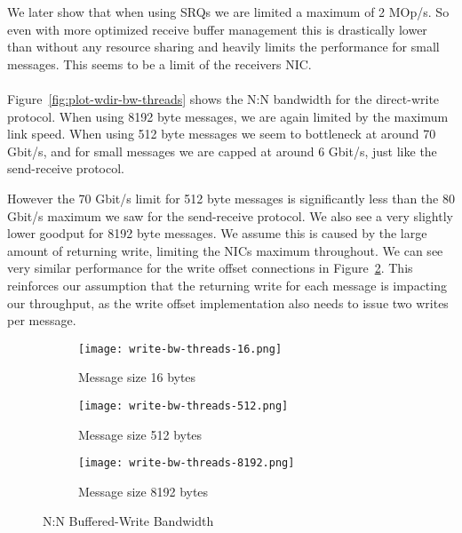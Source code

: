 We later show that when using SRQs we are limited a maximum of 2 MOp/s. So even with more optimized receive buffer management
this is drastically lower than without any resource  sharing and heavily limits the performance for small messages. This seems
to be a limit of the receivers NIC.

\paragraph{} Figure~\ref{fig:plot-wdir-bw-threads} shows the N:N bandwidth for the direct-write protocol. When using 8192 
byte messages, we are again limited by the maximum link speed. When using 512 byte messages we seem to bottleneck at around 
70 Gbit/s, and for small messages we are capped at around 6 Gbit/s, just like the send-receive protocol.

However the 70 Gbit/s limit for 512 byte messages is significantly less than the 80 Gbit/s maximum we saw for the
send-receive protocol. We also see a very slightly lower goodput for 8192 byte messages. We assume this is caused by the 
large amount of returning write, limiting the NICs maximum throughout. We can see very similar performance for the
write offset connections in Figure~\ref{fig:plot-write-bw-thread-512}. This reinforces our assumption that the returning write
for each message is impacting our throughput, as the write offset implementation also needs to issue two writes per message.




\begin{figure}[ht]
  \centering
\begin{subfigure}[b]{0.49\textwidth}
  \centering
  \texttt{[image: write-bw-threads-16.png]}
  \caption{Message size 16 bytes}
  \label{fig:plot-write-bw-thread-16}
\end{subfigure}
\begin{subfigure}[b]{0.49\textwidth}
  \centering
  \texttt{[image: write-bw-threads-512.png]}
  \caption{Message size 512 bytes}
  \label{fig:plot-write-bw-thread-512}
\end{subfigure}
\begin{subfigure}[b]{0.49\textwidth}
  \centering
  \texttt{[image: write-bw-threads-8192.png]}
  \caption{Message size 8192 bytes}
  \label{fig:plot-write-bw-thread-8192}
\end{subfigure}
  \caption{N:N Buffered-Write Bandwidth}
  \label{fig:plot-write-bw-thread}
\end{figure}


